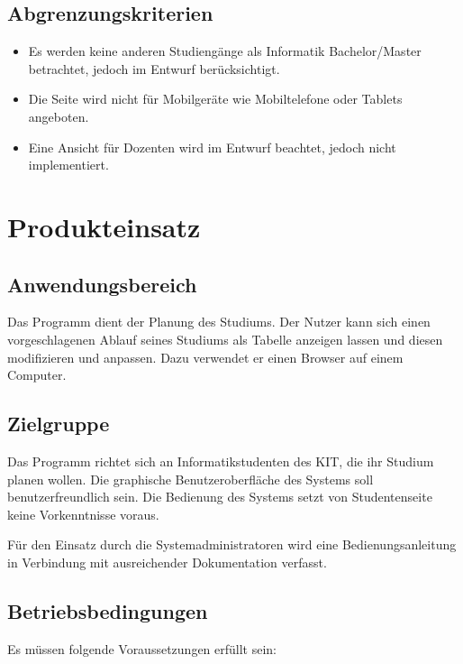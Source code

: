 \documentclass[parskip=full]{scrartcl}
\begin{document}
		\subsection{Abgrenzungskriterien}
	
			\begin{itemize}
				\item Es werden keine anderen Studiengänge als Informatik Bachelor/Master betrachtet, jedoch im Entwurf berücksichtigt.
				\item Die Seite wird nicht für Mobilgeräte wie Mobiltelefone oder Tablets angeboten.
				\item Eine Ansicht für Dozenten wird im Entwurf beachtet, jedoch nicht implementiert.
			\end{itemize}
	
	\section{Produkteinsatz}
	
		\subsection{Anwendungsbereich}
			
			Das Programm dient der Planung des Studiums.
			Der Nutzer kann sich einen vorgeschlagenen Ablauf seines Studiums als Tabelle anzeigen lassen und diesen modifizieren und anpassen. 
			Dazu verwendet er einen \gls{Browser} auf einem Computer.
	
		\subsection{Zielgruppe}
			
			Das Programm richtet sich an Informatikstudenten des KIT, die ihr Studium planen wollen.
			Die graphische Benutzeroberfläche des Systems soll benutzerfreundlich sein. Die Bedienung des Systems setzt von Studentenseite keine Vorkenntnisse voraus.
	
			Für den Einsatz durch die Systemadministratoren wird eine Bedienungsanleitung in Verbindung mit ausreichender Dokumentation verfasst.
	
		\subsection{Betriebsbedingungen}
			
			Es müssen folgende Voraussetzungen erfüllt sein:
			
\end{document}
